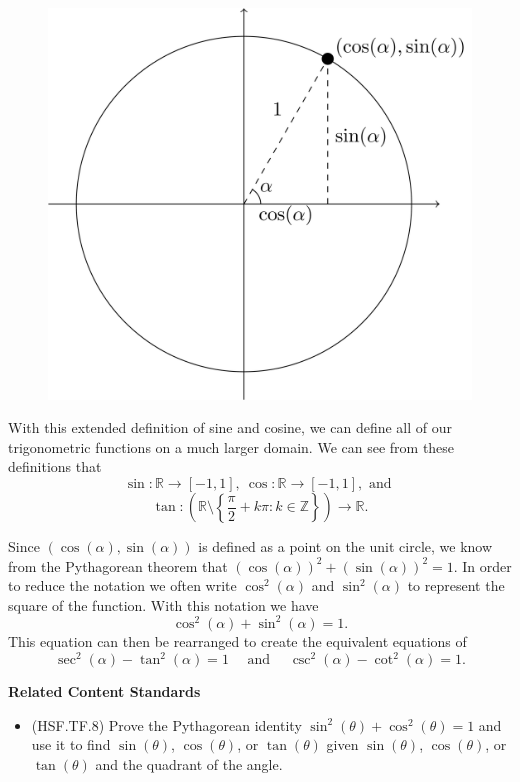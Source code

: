 \documentclass[
]{book}
\providecommand{\tightlist}{%
  \setlength{\itemsep}{0pt}\setlength{\parskip}{0pt}}
\newenvironment{standards}{}{}
\theoremstyle{definition}
\theoremstyle{definition}
\theoremstyle{definition}
\theoremstyle{definition}
\theoremstyle{remark}
\begin{document}
\begin{figure}

{\centering \includegraphics[width=0.5\linewidth]{tikz/unit-circle-trigonometry} 

}

\end{figure}

With this extended definition of sine and cosine, we can define all of our trigonometric functions on a much larger domain. We can see from these definitions that \[\sin:\mathbb{R}\rightarrow [-1,1], \: \cos:\mathbb{R} \rightarrow [-1,1], \mbox{ and }\] \[ \tan: \left( \mathbb{R}\setminus \left\{\frac{\pi}{2} + k\pi: k \in \mathbb{Z}\right\}\right) \rightarrow \mathbb{R}.\]

Since \((\cos(\alpha),\sin(\alpha))\) is defined as a point on the unit circle, we know from the Pythagorean theorem that \(\left(\cos(\alpha)\right)^2 + \left(\sin(\alpha)\right)^2 = 1\). In order to reduce the notation we often write \(\cos^2(\alpha)\) and \(\sin^2(\alpha)\) to represent the square of the function. With this notation we have \[\cos^2(\alpha) +\sin^2(\alpha) = 1.\]
This equation can then be rearranged to create the equivalent equations of
\[\sec^2(\alpha) -\tan^2(\alpha) = 1 \quad \mbox{ and } \quad \csc^2(\alpha)-\cot^2(\alpha) = 1.\]

\begin{standards}

\begin{center}
\textbf{Related Content Standards}

\end{center}

\begin{itemize}
\tightlist
\item
  (HSF.TF.8) Prove the Pythagorean identity \(\sin^2(\theta) + \cos^2(\theta) = 1\) and use it to find \(\sin(\theta)\), \(\cos(\theta)\), or \(\tan(\theta)\) given \(\sin(\theta)\), \(\cos(\theta)\), or \(\tan(\theta)\) and the quadrant of the angle.
\end{itemize}

\end{standards}
\end{document}

